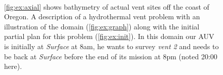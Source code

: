 \begin{figure}
  \centering
  \\
  \hfill {}
  \caption{\small{\ref{fig:ex:axial} shows bathymetry of actual vent
      sites off the coast of Oregon. A description of a hydrothermal
      vent problem with an illustration of the domain
      (\ref{fig:ex:graph}) along with the initial partial plan for
      this problem (\ref{fig:ex:init}). In this domain our AUV is
      initially at {\em Surface} at 8am, he wants to survey {\em vent
        2} and needs to be back at {\em
        Surface} before the end of its mission at 8pm (noted 20:00
      here).}}
\label{fig:Example}
\end{figure}

